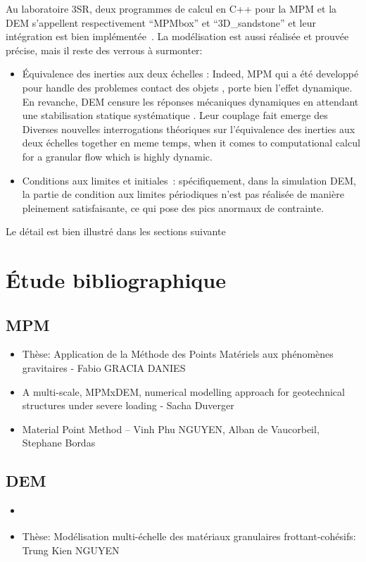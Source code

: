 \documentclass[a4paper,12pt]{report}
\begin{document}
\vspace{2em}
Au laboratoire 3SR, deux programmes de calcul en C++ pour la MPM et la DEM s'appellent respectivement ``MPMbox'' et ``3D\_sandstone'' et leur intégration est bien implémentée~\cite{richefeu2025mpmxdem}.
La modélisation est aussi réalisée et prouvée précise, mais il reste des verrous à surmonter:
\begin{itemize}
    \item Équivalence des inerties aux deux échelles : Indeed, MPM qui a été developpé pour handle des problemes contact des objets \cite{nguyen2023material.}, porte bien l'effet dynamique. En revanche, DEM censure les réponses mécaniques dynamiques en attendant une stabilisation statique systématique \cite{nguyen2014fem}. Leur couplage fait emerge des Diverses nouvelles interrogations théoriques sur l'équivalence des inerties aux deux échelles together en meme temps, when it comes to computational calcul for a granular flow which is highly dynamic.
    \item Conditions aux limites et initiales~: spécifiquement, dans la simulation DEM, la partie de condition aux limites périodiques n'est pas réalisée de manière pleinement satisfaisante, ce qui pose des pics anormaux de contrainte.
\end{itemize}
Le détail est bien illustré dans les sections suivante



\chapter{Étude bibliographique}
\section{MPM}
\begin{itemize}
\item Thèse: Application de la Méthode des Points Matériels aux phénomènes gravitaires - Fabio GRACIA DANIES
\item A multi-scale, MPMxDEM, numerical modelling approach for geotechnical structures under severe loading - Sacha Duverger
\item Material Point Method -- Vinh Phu NGUYEN, Alban de Vaucorbeil, Stephane Bordas
\end{itemize}
\section{DEM}
\begin{itemize}
      \item \cite{combe2023demlecture}
      \item Thèse: Modélisation multi-échelle des matériaux granulaires frottant-cohésifs: Trung Kien NGUYEN
\end{itemize}
\end{document}
